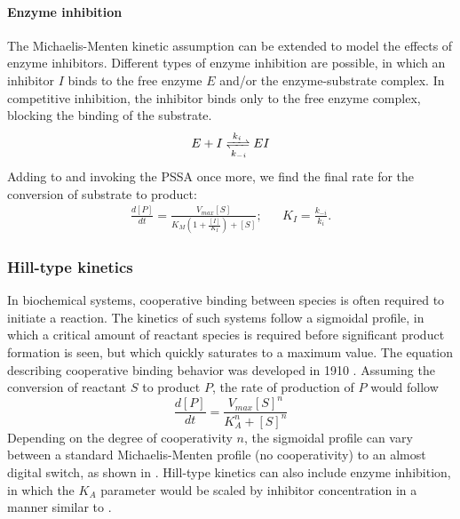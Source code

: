 \paragraph{Enzyme inhibition}
The Michaelis-Menten kinetic assumption can be extended to model the effects of enzyme inhibitors.
Different types of enzyme inhibition are possible, in which an inhibitor $I$ binds to the free enzyme $E$ and/or the enzyme-substrate complex.
In competitive inhibition, the inhibitor binds only to the free enzyme complex, blocking the binding of the substrate.
\begin{equation}
  E + I \xrightleftharpoons[k_{-i}]{k_{i}} EI
  \label{eq:compinh}
\end{equation}
Adding  to  and invoking the PSSA once more, we find the final rate for the conversion of substrate to product:
\begin{align}
  \frac{d[P]}{dt} = \frac{V_{max}[S]}{K_M\left(1 + \frac{[I]}{K_I}\right) + [S]}; & & K_I = \frac{k_{-i}}{k_i}.\label{eq:inheq}
\end{align}

\subsubsection{Hill-type kinetics}

In biochemical systems, cooperative binding between species is often required to initiate a reaction. 
The kinetics of such systems follow a sigmoidal profile, in which a critical amount of reactant species is required before significant product formation is seen, but which quickly saturates to a maximum value. 
The equation describing cooperative binding behavior was developed in 1910 \cite{Hill1910}. Assuming the conversion of reactant $S$ to product $P$, the rate of production of $P$ would follow
\begin{equation}
  \frac{d[P]}{dt} = \frac{V_{max} [S]^n}{K_A^n + [S]^n}
  \label{eq:hill}
\end{equation}
Depending on the degree of cooperativity $n$, the sigmoidal profile can vary between a standard Michaelis-Menten profile (no cooperativity) to an almost digital switch, as shown in .
Hill-type kinetics can also include enzyme inhibition, in which the $K_A$ parameter would be scaled by inhibitor concentration in a manner similar to .

